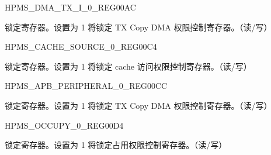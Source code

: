 \begin{register}{H}{PMS\_DMA\_TX\_I\_0\_REG}{\hexprefix{}00AC}\label{regdesc:PMSDMATXI0REG}
%
%
\regnewline%
\begin{regdesc}\begin{reglist}
\label{fielddesc:PMSDMATXILOCK}\item [PMS\_DMA\_TX\_I\_LOCK] 锁定寄存器。设置为 1 将锁定 TX Copy DMA 权限控制寄存器。（读/写）
\end{reglist}\end{regdesc}
\end{register}


\begin{register}{H}{PMS\_CACHE\_SOURCE\_0\_REG}{\hexprefix{}00C4}\label{regdesc:PMSCACHESOURCE0REG}
%
%
\regnewline%
\begin{regdesc}\begin{reglist}
\label{fielddesc:PMSCACHESOURCELOCK}\item [PMS\_CACHE\_SOURCE\_LOCK] 锁定寄存器。设置为 1 将锁定 cache 访问权限控制寄存器。（读/写）
\end{reglist}\end{regdesc}
\end{register}


\begin{register}{H}{PMS\_APB\_PERIPHERAL\_0\_REG}{\hexprefix{}00CC}\label{regdesc:PMSAPBPERIPHERAL0REG}
%
%
\regnewline%
\begin{regdesc}\begin{reglist}
\label{fielddesc:PMSAPBPERIPHERALLOCK}\item [PMS\_APB\_PERIPHERAL\_LOCK] 锁定寄存器。设置为 1 将锁定 TX Copy DMA 权限控制寄存器。（读/写）
\end{reglist}\end{regdesc}
\end{register}


\begin{register}{H}{PMS\_OCCUPY\_0\_REG}{\hexprefix{}00D4}\label{regdesc:PMSOCCUPY0REG}
%
%
\regnewline%
\begin{regdesc}\begin{reglist}
\label{fielddesc:PMSOCCUPYLOCK}\item [PMS\_OCCUPY\_LOCK] 锁定寄存器。设置为 1 将锁定占用权限控制寄存器。（读/写）
\end{reglist}\end{regdesc}
\end{register}


